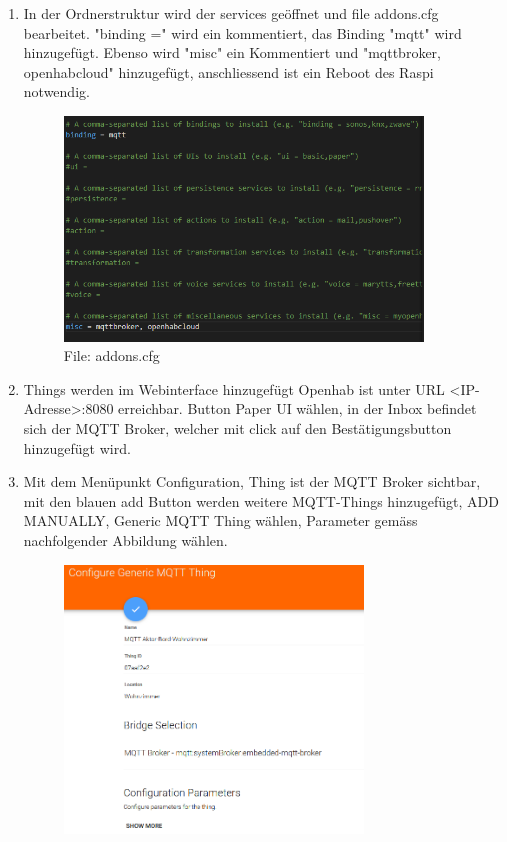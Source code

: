 \begin{enumerate}
	\item In der Ordnerstruktur wird der services geöffnet und file addons.cfg bearbeitet. "binding =" wird ein kommentiert, das Binding "mqtt" wird hinzugefügt. Ebenso wird "misc" ein Kommentiert und "mqttbroker, openhabcloud" hinzugefügt, anschliessend ist ein Reboot des Raspi notwendig.  
	   \begin{figure}[H]
		\centering
		\includegraphics[width=0.9\textwidth]{graphics/addpnscfg.PNG}
		\caption{File: addons.cfg} 	
		\label{pic: addons.cfg}
	\end{figure} 
\item Things werden im Webinterface hinzugefügt Openhab ist unter URL <IP-Adresse>:8080 erreichbar. Button Paper UI wählen, in der Inbox befindet sich der MQTT Broker, welcher mit click auf den Bestätigungsbutton hinzugefügt wird. 
\item Mit dem Menüpunkt Configuration, Thing ist der MQTT Broker sichtbar, mit den blauen add Button werden weitere MQTT-Things hinzugefügt, ADD MANUALLY, Generic MQTT Thing wählen, Parameter gemäss nachfolgender Abbildung wählen.
	   \begin{figure}[H]
	\centering
	\includegraphics[width=0.75\textwidth]{graphics/MQTT-Thing.PNG}

\end{figure}
\end{enumerate}
